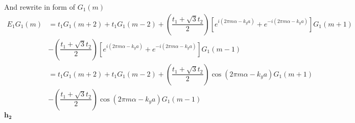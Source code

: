 \documentclass{report}
\newcommand{\f}[2]{\dfrac{#1}{#2}}
\begin{document}
And rewrite in form of $G_{1}(m)$
\begin{align*}
	E_{1}G_{1}(m)
	 & = t_{1}G_{1}(m+2) + t_{1}G_{1}(m-2) + \left(\f{t_{1} + \sqrt{3}t_{2}}{2}\right)\left[e^{i(2\pi m \alpha - k_y a)} + e^{-i(2\pi m \alpha - k_y a)}\right] G_{1}(m+1) \\
	 & - \left(\f{t_{1} + \sqrt{3}t_{2}}{2}\right)\left[e^{i(2\pi m \alpha - k_y a)} + e^{-i(2\pi m \alpha - k_y a)}\right] G_{1}(m-1)                                     \\
	 & = t_{1}G_{1}(m+2) + t_{1}G_{1}(m-2) + \left(\f{t_{1} + \sqrt{3}t_{2}}{2}\right) \cos(2\pi m \alpha - k_y a) G_{1}(m+1)                                              \\
	 & - \left(\f{t_{1} + \sqrt{3}t_{2}}{2}\right) \cos(2\pi m \alpha - k_y a) G_{1}(m-1) \tag{7}
\end{align*}
\newpage
$\mathbf{h_2}$
\end{document}
